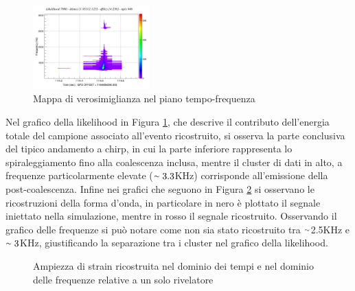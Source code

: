 \begin{figure}
	\vspace{-20pt}
	\begin{center}
		\includegraphics[width=0.4\textwidth]{figures/Capitolo_3/APR4_q09/l_tfmap_scalogram.png}
	\end{center}
	\vspace{-10pt}
	\caption{Mappa di verosimiglianza nel piano tempo-frequenza}
	\label{fig:Likelihood_APR4}
	\vspace{-10pt}
\end{figure}
Nel grafico della likelihood in Figura \ref{fig:Likelihood_APR4}, che descrive il contributo dell'energia totale del campione associato all'evento ricostruito, si osserva la parte conclusiva del tipico andamento a chirp, in cui la parte inferiore rappresenta lo spiraleggiamento fino alla coalescenza inclusa, mentre il cluster di dati in alto, a frequenze particolarmente elevate ($\smallsim 3.3$KHz) corrisponde all'emissione della post-coalescenza.
Infine nei grafici che seguono in Figura \ref{fig:strain_apr4} si osservano le ricostruzioni della forma d'onda, in particolare in nero è plottato il segnale iniettato nella simulazione, mentre in rosso il segnale ricostruito. Osservando il grafico delle frequenze si può notare come non sia stato ricostruito tra $\smallsim$2.5KHz e $\smallsim3$KHz, giustificando la separazione tra i cluster nel grafico della likelihood.
\begin{figure}[H]
	\vspace{-10pt}
	\centering
	 \quad\quad
	\vspace{-5pt}
	\caption{Ampiezza di strain ricostruita nel dominio dei tempi e nel dominio delle frequenze relative a un solo rivelatore}
	\label{fig:strain_apr4}
	\vspace{-15pt}
\end{figure}
